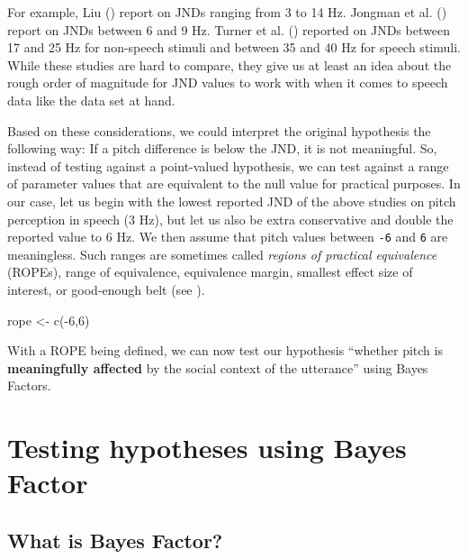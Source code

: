 \documentclass[
  doc,
  floatsintext,
  longtable,
  nolmodern,
  notxfonts,
  notimes,
  colorlinks=true,linkcolor=blue,citecolor=blue,urlcolor=blue]{apa7}
\newenvironment{Shaded}{\begin{snugshade}}{\end{snugshade}}
\newcommand{\DecValTok}[1]{\textcolor[rgb]{0.68,0.00,0.00}{#1}}
\newcommand{\FunctionTok}[1]{\textcolor[rgb]{0.28,0.35,0.67}{#1}}
\newcommand{\NormalTok}[1]{\textcolor[rgb]{0.00,0.23,0.31}{#1}}
\newcommand{\OtherTok}[1]{\textcolor[rgb]{0.00,0.23,0.31}{#1}}
\newcommand{\SpecialCharTok}[1]{\textcolor[rgb]{0.37,0.37,0.37}{#1}}
\begin{document}
For example, Liu () report on JNDs
ranging from 3 to 14 Hz. Jongman et al.
() report on JNDs between 6 and 9
Hz. Turner et al. () reported
on JNDs between 17 and 25 Hz for non-speech stimuli and between 35 and
40 Hz for speech stimuli. While these studies are hard to compare, they
give us at least an idea about the rough order of magnitude for JND
values to work with when it comes to speech data like the data set at
hand.

Based on these considerations, we could interpret the original
hypothesis the following way: If a pitch difference is below the JND, it
is not meaningful. So, instead of testing against a point-valued
hypothesis, we can test against a range of parameter values that are
equivalent to the null value for practical purposes. In our case, let us
begin with the lowest reported JND of the above studies on pitch
perception in speech (3 Hz), but let us also be extra conservative and
double the reported value to 6 Hz. We then assume that pitch values
between \texttt{-6} and \texttt{6} are meaningless. Such ranges are
sometimes called \emph{regions of practical equivalence} (ROPEs), range
of equivalence, equivalence margin, smallest effect size of interest, or
good-enough belt (see
).

\begin{Shaded}
\begin{Highlighting}[]
\NormalTok{rope }\OtherTok{\textless{}{-}} \FunctionTok{c}\NormalTok{(}\SpecialCharTok{{-}}\DecValTok{6}\NormalTok{,}\DecValTok{6}\NormalTok{)}
\end{Highlighting}
\end{Shaded}

With a ROPE being defined, we can now test our hypothesis ``whether
pitch is \textbf{meaningfully affected} by the social context of the
utterance'' using Bayes Factors.

\section{Testing hypotheses using Bayes
Factor}\label{testing-hypotheses-using-bayes-factor}

\subsection{What is Bayes Factor?}\label{what-is-bayes-factor}
\end{document}
